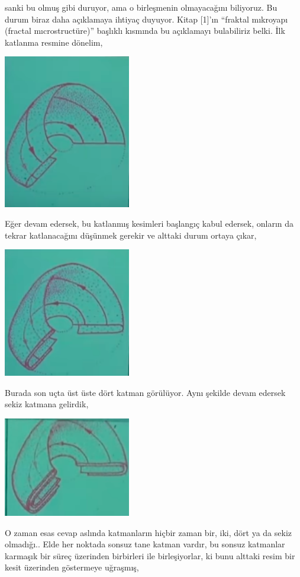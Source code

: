 \documentclass[12pt,fleqn]{article}\usepackage{../../common}
\begin{document}
sanki bu olmuş gibi duruyor, ama o birleşmenin olmayacağını biliyoruz. Bu durum
biraz daha açıklamaya ihtiyaç duyuyor. Kitap [1]'ın ``fraktal mıkroyapı (fractal
mıcrostructüre)'' başlıklı kısmında bu açıklamayı bulabiliriz belki. İlk
katlanma resmine dönelim,

\includegraphics[width=15em]{23_21.png}

Eğer devam edersek, bu katlanmış kesimleri başlangıç kabul edersek, onların da
tekrar katlanacağını düşünmek gerekir ve alttaki durum ortaya çıkar,

\includegraphics[width=15em]{23_22.png}

Burada son uçta üst üste dört katman görülüyor. Aynı şekilde devam edersek sekiz
katmana gelirdik,

\includegraphics[width=15em]{23_23.png}

O zaman esas cevap aslında katmanların hiçbir zaman bir, iki, dört ya da sekiz
olmadığı.. Elde her noktada sonsuz tane katman vardır, bu sonsuz katmanlar
karmaşık bir süreç üzerinden birbirleri ile birleşiyorlar, ki bunu alttaki resim
bir kesit üzerinden göstermeye uğraşmış,
\end{document}
